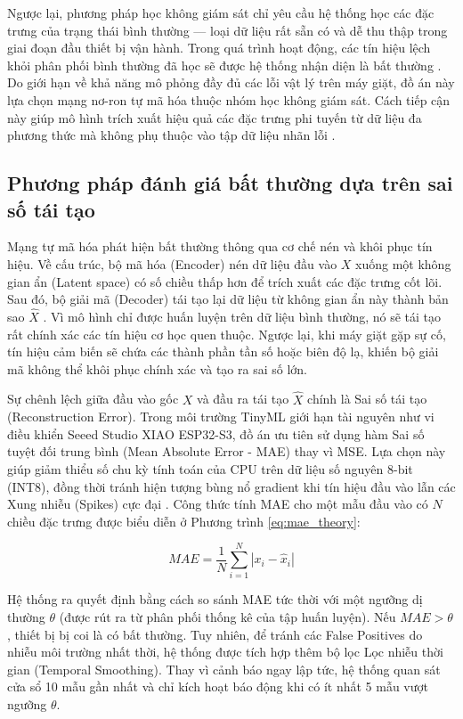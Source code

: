 Ngược lại, phương pháp học không giám sát chỉ yêu cầu hệ thống học các đặc trưng của trạng thái bình thường — loại dữ liệu rất sẵn có và dễ thu thập trong giai đoạn đầu thiết bị vận hành. Trong quá trình hoạt động, các tín hiệu lệch khỏi phân phối bình thường đã học sẽ được hệ thống nhận diện là bất thường \cite{ref_1_4}. Do giới hạn về khả năng mô phỏng đầy đủ các lỗi vật lý trên máy giặt, đồ án này lựa chọn mạng nơ-ron tự mã hóa thuộc nhóm học không giám sát. Cách tiếp cận này giúp mô hình trích xuất hiệu quả các đặc trưng phi tuyến từ dữ liệu đa phương thức mà không phụ thuộc vào tập dữ liệu nhãn lỗi \cite{ref_1_6}.

\subsection{Phương pháp đánh giá bất thường dựa trên sai số tái tạo}

Mạng tự mã hóa phát hiện bất thường thông qua cơ chế nén và khôi phục tín hiệu. Về cấu trúc, bộ mã hóa (Encoder) nén dữ liệu đầu vào $X$ xuống một không gian ẩn (Latent space) có số chiều thấp hơn để trích xuất các đặc trưng cốt lõi. Sau đó, bộ giải mã (Decoder) tái tạo lại dữ liệu từ không gian ẩn này thành bản sao $\hat{X}$ \cite{ref_1_6}. Vì mô hình chỉ được huấn luyện trên dữ liệu bình thường, nó sẽ tái tạo rất chính xác các tín hiệu cơ học quen thuộc. Ngược lại, khi máy giặt gặp sự cố, tín hiệu cảm biến sẽ chứa các thành phần tần số hoặc biên độ lạ, khiến bộ giải mã không thể khôi phục chính xác và tạo ra sai số lớn.

Sự chênh lệch giữa đầu vào gốc $X$ và đầu ra tái tạo $\hat{X}$ chính là Sai số tái tạo (Reconstruction Error). Trong môi trường TinyML giới hạn tài nguyên như vi điều khiển Seeed Studio XIAO ESP32-S3, đồ án ưu tiên sử dụng hàm Sai số tuyệt đối trung bình (Mean Absolute Error - MAE) thay vì MSE. Lựa chọn này giúp giảm thiểu số chu kỳ tính toán của CPU trên dữ liệu số nguyên 8-bit (INT8), đồng thời tránh hiện tượng bùng nổ gradient khi tín hiệu đầu vào lẫn các Xung nhiễu (Spikes) cực đại \cite{ref_1_1, ref_1_4}. Công thức tính MAE cho một mẫu đầu vào có $N$ chiều đặc trưng được biểu diễn ở Phương trình \ref{eq:mae_theory}:

\begin{equation}\label{eq:mae_theory}MAE = \frac{1}{N} \sum_{i=1}^{N} |x_i - \hat{x}_i|\end{equation}

Hệ thống ra quyết định bằng cách so sánh MAE tức thời với một ngưỡng dị thường $\theta$ (được rút ra từ phân phối thống kê của tập huấn luyện). Nếu $MAE > \theta$, thiết bị bị coi là có bất thường. Tuy nhiên, để tránh các False Positives do nhiễu môi trường nhất thời, hệ thống được tích hợp thêm bộ lọc Lọc nhiễu thời gian (Temporal Smoothing). Thay vì cảnh báo ngay lập tức, hệ thống quan sát cửa sổ 10 mẫu gần nhất và chỉ kích hoạt báo động khi có ít nhất 5 mẫu vượt ngưỡng $\theta$.

